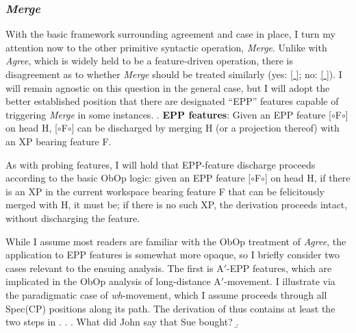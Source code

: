 \documentclass[11pt, letterpaper]{paper_nick}
\newcommand{\fm}[1]{[$\circ$#1$\circ$]}
\begin{document}
\subsubsection{\emph{Merge}}
With the basic framework surrounding agreement and case in place, I turn my attention now to the other primitive syntactic operation, \emph{Merge}. Unlike with \emph{Agree}, which is widely held to be a feature-driven operation, there is disagreement as to whether \emph{Merge} should be treated similarly (yes: \ref{ }; no: \ref{ }). I will remain agnostic on this question in the general case, but I will adopt the better established position that there are designated ``EPP'' features capable of triggering \emph{Merge} in some instances. 
\ex. \textbf{EPP features}: Given an EPP feature \fm{F} on head H, \fm{F} can be discharged by merging H (or a projection thereof) with an XP bearing feature F. 

As with probing features, I will hold that EPP-feature discharge proceeds according to the basic ObOp logic: given an EPP feature \fm{F} on head H, if there is an XP in the current workspace bearing feature F that can be felicitously merged with H, it must be; if there is no such XP, the derivation proceeds intact, without discharging the feature. %

While I assume most readers are familiar with the ObOp treatment of \emph{Agree}, the application to EPP features is somewhat more opaque, so I briefly consider two cases relevant to the ensuing analysis. The first is A$'$-EPP features, which are implicated in the ObOp analysis of long-distance A$'$-movement. I illustrate via the paradigmatic case of \emph{wh}-movement, which I assume proceeds through all Spec(CP) positions along its path. The derivation of \Next[a] thus contains at least the two steps in \Next[b].
\ex. \a. What did John say that Sue bought?
\b. 
\end{document}
